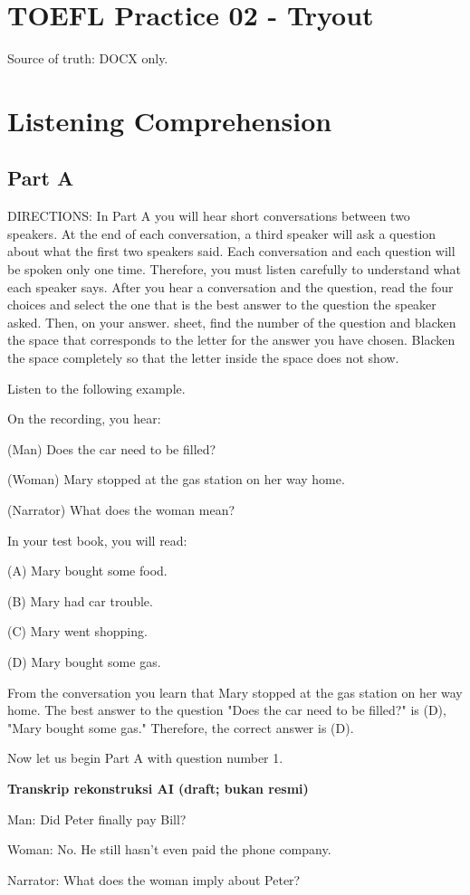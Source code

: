 \documentclass[12pt]{article}
\begin{document}
\section*{TOEFL Practice 02 - Tryout}
Source of truth: DOCX only.
\section*{Listening Comprehension}
\subsection*{Part A}
DIRECTIONS: In Part A you will hear short conversations between two speakers. At the end of each conversation, a third speaker will ask a question about what the first two speakers said. Each conversation and each question will be spoken only one time. Therefore, you must listen carefully to understand what each speaker says. After you hear a conversation and the question, read the four choices and select the one that is the best answer to the question the speaker asked. Then, on your answer. sheet, find the number of the question and blacken the space that corresponds to the letter for the answer you have chosen. Blacken the space completely so that the letter inside the space does not show.\par
\begin{exampleblock}
Listen to the following example.\par
On the recording, you hear:\par
(Man) Does the car need to be filled?\par
(Woman) Mary stopped at the gas station on her way home.\par
(Narrator) What does the woman mean?\par
In your test book, you will read:\par
(A) Mary bought some food.\par
(B) Mary had car trouble.\par
(C) Mary went shopping.\par
(D) Mary bought some gas.\par
From the conversation you learn that Mary stopped at the gas station on her way home. The best answer to the question "Does the car need to be filled?" is (D), "Mary bought some gas." Therefore, the correct answer is (D).\par
Now let us begin Part A with question number 1.\par
\end{exampleblock}
\begin{exampleblock}
\textbf{Transkrip rekonstruksi AI (draft; bukan resmi)}\par
Man: Did Peter finally pay Bill?\par
Woman: No. He still hasn't even paid the phone company.\par
Narrator: What does the woman imply about Peter?\par
\end{exampleblock}
\end{document}
